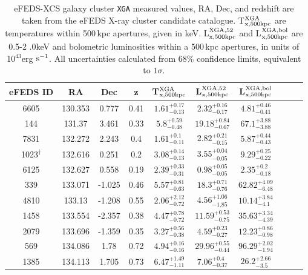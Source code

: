 \documentclass[fleqn,usenatbib]{mnras}
\begin{document}
\begin{table}
\begin{center}
\caption[]{{eFEDS-XCS galaxy cluster \texttt{XGA} measured values, RA, Dec, and redshift are taken from the eFEDS X-ray cluster candidate catalogue. T$^{\rm{XGA}}_{\rm{x}, 500kpc}$ are temperatures within 500\,kpc apertures, given in keV. L$^{\rm{XGA, 52}}_{\rm{x, 500kpc}}$ and L$^{\rm{XGA, bol}}_{\rm{x, 500kpc}}$ are 0.5-2 .0keV and bolometric luminosities within a 500\,kpc apertures, in units of 10$^{43}$erg $\rm{s}^{-1}$. All uncertainties calculated from 68\% confidence limits, equivalent to $1\sigma$.}\label{tab:measurements}}
\vspace{1mm}
\begin{tabular}{cccccccccc}
\hline
\hline
eFEDS ID & RA & Dec & z & T$^{\rm{XGA}}_{\rm{x}, 500kpc}$ & L$^{\rm{XGA, 52}}_{\rm{x, 500kpc}}$ & L$^{\rm{XGA, bol}}_{\rm{x, 500kpc}}$\\
\hline
\hline
6605 & 130.353 & 0.777 & 0.41 & $1.61^{+0.17}_{-0.13}$ & $2.32^{+0.16}_{-0.17}$ & $4.81^{+0.46}_{-0.41}$ \\ 
\hline
144 & 131.37 & 3.461 & 0.33 & $5.8^{+0.59}_{-0.48}$ & $19.18^{+0.84}_{-0.67}$ & $67.1^{+3.88}_{-3.88}$ \\ 
\hline
7831 & 132.272 & 2.243 & 0.4 & $1.61^{+0.1}_{-0.11}$ & $2.82^{+0.21}_{-0.15}$ & $5.87^{+0.44}_{-0.43}$ \\ 
\hline
1023$^{\dagger}$ & 132.616 & 0.251 & 0.2 & $3.08^{+0.14}_{-0.13}$ & $3.55^{+0.04}_{-0.05}$ & $9.29^{+0.25}_{-0.22}$ \\ 
\hline
6125 & 132.627 & 0.558 & 0.19 & $2.39^{+0.33}_{-0.31}$ & $0.98^{+0.05}_{-0.05}$ & $2.35^{+0.2}_{-0.18}$ \\ 
\hline
339 & 133.071 & -1.025 & 0.46 & $5.57^{+0.81}_{-0.63}$ & $18.3^{+0.71}_{-0.76}$ & $62.82^{+4.09}_{-6.48}$ \\ 
\hline
4810 & 133.13 & -1.208 & 0.55 & $2.06^{+2.12}_{-0.72}$ & $4.56^{+1.06}_{-1.85}$ & $10.14^{+3.84}_{-4.1}$ \\ 
\hline
1458 & 133.554 & -2.357 & 0.38 & $4.47^{+0.78}_{-0.72}$ & $11.59^{+0.53}_{-0.75}$ & $35.63^{+3.34}_{-4.39}$ \\ 
\hline
2079 & 133.696 & -1.359 & 0.35 & $3.27^{+0.56}_{-0.38}$ & $4.59^{+0.23}_{-0.27}$ & $12.23^{+0.86}_{-0.98}$ \\ 
\hline
569 & 134.086 & 1.78 & 0.72 & $4.94^{+0.16}_{-0.16}$ & $29.96^{+0.55}_{-0.44}$ & $96.29^{+2.02}_{-1.94}$ \\ 
\hline
1385 & 134.113 & 1.705 & 0.73 & $6.47^{+1.49}_{-1.11}$ & $7.06^{+0.4}_{-0.37}$ & $26.2^{+2.66}_{-3.5}$ \\ 

\end{tabular}
\end{center}
\end{table}
\end{document}
